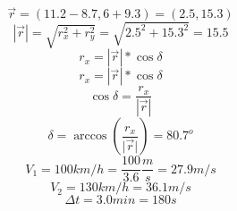\documentclass{book}
\newcommand{\abs}[1]{\lvert#1\rvert}
\begin{document}
	\begin{equation*}
		\overrightarrow{r}=(11.2-8.7,6+9.3)=(2.5,15.3)
	\end{equation*}
	\begin{equation*}
		|\overrightarrow{r}|=\sqrt{r^2_x+r^2_y}=\sqrt{2.5^2+15.3^2}=15.5
	\end{equation*}
	\begin{equation*}
		r_x=|\overrightarrow{r}|*\cos \delta
	\end{equation*}
	\begin{equation*}
		r_x=|\overrightarrow{r}|*\cos \delta
	\end{equation*}
	\begin{equation*}
		\cos \delta=\frac{r_x}{|\overrightarrow{r}|}
	\end{equation*}
	\begin{equation*}
		\delta=\arccos\left(\frac{r_x}{\abs{\overrightarrow{r}}}\right)=80.7^o
	\end{equation*}
	\begin{equation*}
		V_1=100km/h=\frac{100}{3.6}\frac{m}{s}=27.9m/s
	\end{equation*}
	\begin{equation*}
		V_2=130km/h=36.1m/s
	\end{equation*}
	\begin{equation*}
		\Delta t=3.0min=180s
	\end{equation*}
\end{document}
